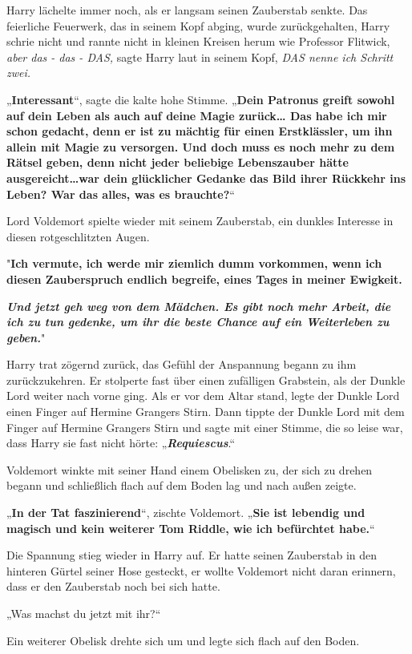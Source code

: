 {Harry lächelte immer noch, als er langsam seinen Zauberstab senkte. Das feierliche Feuerwerk, das in seinem Kopf abging, wurde zurückgehalten, Harry schrie nicht und rannte nicht in kleinen Kreisen herum wie Professor Flitwick, \emph{aber das - das - DAS,} sagte Harry laut in seinem Kopf, \emph{DAS nenne ich Schritt zwei.}

„\textbf{Interessant}“, sagte die kalte hohe Stimme. „\textbf{Dein Patronus greift sowohl auf dein Leben als auch auf deine Magie zurück… Das habe ich mir schon gedacht, denn er ist zu mächtig für einen Erstklässler, um ihn allein mit Magie zu versorgen. Und doch muss es noch mehr zu dem Rätsel geben, denn nicht jeder beliebige Lebenszauber hätte ausgereicht…war dein glücklicher Gedanke das Bild ihrer Rückkehr ins Leben? War das alles, was es brauchte?}“

Lord Voldemort spielte wieder mit seinem Zauberstab, ein dunkles Interesse in diesen rotgeschlitzten Augen.

"\textbf{Ich vermute, ich werde mir ziemlich dumm vorkommen, wenn ich diesen Zauberspruch endlich begreife, eines Tages in meiner Ewigkeit.}

\textbf{\emph{Und jetzt geh weg von dem Mädchen. Es gibt noch mehr Arbeit, die ich zu tun gedenke, um ihr die beste Chance auf ein Weiterleben zu geben.}}"

Harry trat zögernd zurück, das Gefühl der Anspannung begann zu ihm zurückzukehren. Er stolperte fast über einen zufälligen Grabstein, als der Dunkle Lord weiter nach vorne ging. Als er vor dem Altar stand, legte der Dunkle Lord einen Finger auf Hermine Grangers Stirn. Dann tippte der Dunkle Lord mit dem Finger auf Hermine Grangers Stirn und sagte mit einer Stimme, die so leise war, dass Harry sie fast nicht hörte: „\textbf{\emph{Requiescus}}.“

Voldemort winkte mit seiner Hand einem Obelisken zu, der sich zu drehen begann und schließlich flach auf dem Boden lag und nach außen zeigte.

„\textbf{In der Tat faszinierend}“, zischte Voldemort. „\textbf{Sie ist lebendig und magisch und kein weiterer Tom Riddle, wie ich befürchtet habe.}“

Die Spannung stieg wieder in Harry auf. Er hatte seinen Zauberstab in den hinteren Gürtel seiner Hose gesteckt, er wollte Voldemort nicht daran erinnern, dass er den Zauberstab noch bei sich hatte.

„Was machst du jetzt mit ihr?“

Ein weiterer Obelisk drehte sich um und legte sich flach auf den Boden.

}
